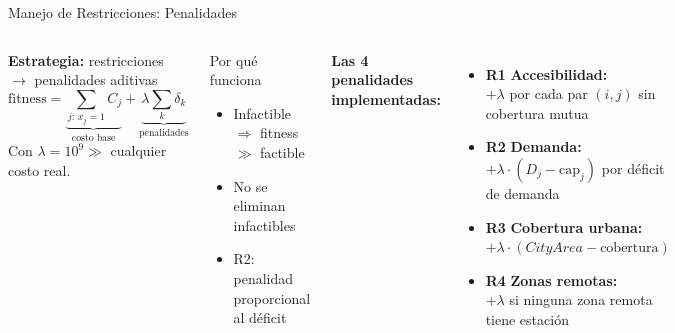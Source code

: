 \documentclass[aspectratio=169, 12pt]{beamer}
\newcommand{\acento}[1]{\textcolor{Verde}{\textbf{#1}}}
\begin{document}
\begin{frame}{Manejo de Restricciones: Penalidades}
  \begin{columns}[T]
    \textbf{Estrategia:} restricciones $\rightarrow$ penalidades aditivas
    {\setlength\abovedisplayskip{3pt}\setlength\belowdisplayskip{3pt}
    \[
      \text{fitness} =
        \underbrace{\sum_{j:\,x_j=1}C_j}_{\text{costo base}}
        + \underbrace{\lambda\sum_k\delta_k}_{\text{penalidades}}
    \]
    }
    Con $\lambda = 10^9 \gg$ cualquier costo real.
    \vspace{0.2em}
    \begin{block}{Por qué funciona}
      \begin{itemize}\footnotesize
        \item Infactible $\Rightarrow$ fitness $\gg$ factible
        \item No se eliminan infactibles
        \item R2: penalidad proporcional al déficit
      \end{itemize}
    \end{block}

    \textbf{Las 4 penalidades implementadas:}
    \vspace{0.3em}
    \begin{itemize}\footnotesize
      \item \acento{R1} \textbf{Accesibilidad:}\\
        $+\lambda$ por cada par $(i,j)$ sin cobertura mutua
      \vspace{0.25em}
      \item \acento{R2} \textbf{Demanda:}\\
        $+\lambda\cdot(D_j - \text{cap}_j)$ por déficit de demanda
      \vspace{0.25em}
      \item \acento{R3} \textbf{Cobertura urbana:}\\
        $+\lambda\cdot(\textit{CityArea} - \text{cobertura})$
      \vspace{0.25em}
      \item \acento{R4} \textbf{Zonas remotas:}\\
        $+\lambda$ si ninguna zona remota tiene estación
    \end{itemize}
  \end{columns}
\end{frame}
\end{document}
